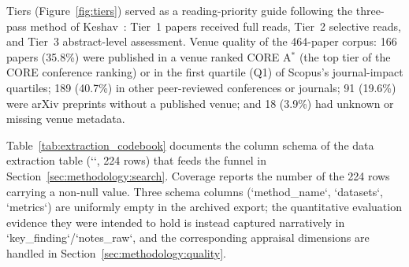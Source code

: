 Tiers (Figure~\ref{fig:tiers}) served as a reading-priority guide following the three-pass method of
Keshav~\cite{Keshav2007}: Tier~1 papers received full reads, Tier~2
selective reads, and Tier~3 abstract-level assessment. Venue quality of the
464-paper corpus: 166 papers (35.8\%) were published in a venue ranked
CORE A$^*$ (the top tier of the CORE conference ranking) or in the first
quartile (Q1) of Scopus's journal-impact quartiles; 189 (40.7\%) in other peer-reviewed conferences or journals; 91
(19.6\%) were arXiv preprints without a published venue; and 18 (3.9\%) had
unknown or missing venue metadata.

Table~\ref{tab:extraction_codebook} documents the column schema of the data
extraction table (`\texttt{}`, 224 rows) that feeds
the funnel in Section~\ref{sec:methodology:search}. Coverage reports the number
of the 224 rows carrying a non-null value. Three schema columns
(`method\_name`, `datasets`, `metrics`) are uniformly empty in the archived
export; the quantitative evaluation evidence they were intended to hold is
instead captured narratively in `key\_finding`/`notes\_raw`, and the
corresponding appraisal dimensions are handled in
Section~\ref{sec:methodology:quality}.

